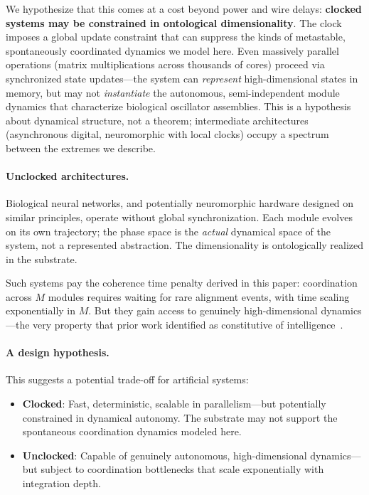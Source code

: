 \documentclass[12pt]{article}
\begin{document}
We hypothesize that this comes at a cost beyond power and wire delays: \textbf{clocked systems may be constrained in ontological dimensionality}. The clock imposes a global update constraint that can suppress the kinds of metastable, spontaneously coordinated dynamics we model here. Even massively parallel operations (matrix multiplications across thousands of cores) proceed via synchronized state updates---the system can \emph{represent} high-dimensional states in memory, but may not \emph{instantiate} the autonomous, semi-independent module dynamics that characterize biological oscillator assemblies. This is a hypothesis about dynamical structure, not a theorem; intermediate architectures (asynchronous digital, neuromorphic with local clocks) occupy a spectrum between the extremes we describe.

\paragraph{Unclocked architectures.} Biological neural networks, and potentially neuromorphic hardware designed on similar principles, operate without global synchronization. Each module evolves on its own trajectory; the phase space is the \emph{actual} dynamical space of the system, not a represented abstraction. The dimensionality is ontologically realized in the substrate.

Such systems pay the coherence time penalty derived in this paper: coordination across $M$ modules requires waiting for rare alignment events, with time scaling exponentially in $M$. But they gain access to genuinely high-dimensional dynamics---the very property that prior work identified as constitutive of intelligence~\cite{todd2025intelligence}.

\paragraph{A design hypothesis.} This suggests a potential trade-off for artificial systems:
\begin{itemize}
\item \textbf{Clocked}: Fast, deterministic, scalable in parallelism---but potentially constrained in dynamical autonomy. The substrate may not support the spontaneous coordination dynamics modeled here.
\item \textbf{Unclocked}: Capable of genuinely autonomous, high-dimensional dynamics---but subject to coordination bottlenecks that scale exponentially with integration depth.
\end{itemize}
\end{document}
